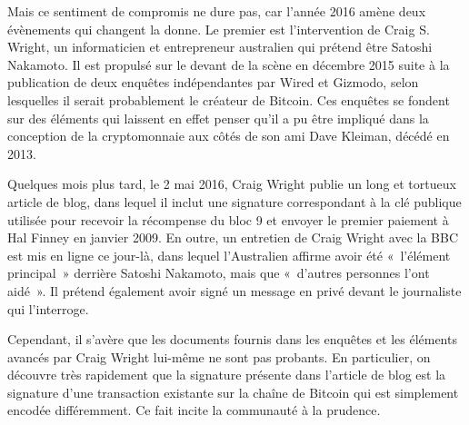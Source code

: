 Mais ce sentiment de compromis ne dure pas, car l'année 2016 amène deux évènements qui changent la donne. Le premier est l'intervention de Craig S. Wright, un informaticien et entrepreneur australien qui prétend être Satoshi Nakamoto. Il est propulsé sur le devant de la scène en décembre 2015 suite à la publication de deux enquêtes indépendantes par Wired et Gizmodo, selon lesquelles il serait probablement le créateur de Bitcoin. Ces enquêtes se fondent sur des éléments qui laissent en effet penser qu'il a pu être impliqué dans la conception de la cryptomonnaie aux côtés de son ami Dave Kleiman, décédé en 2013.

Quelques mois plus tard, le 2 mai 2016, Craig Wright publie un long et tortueux article de blog, dans lequel il inclut une signature correspondant à la clé publique utilisée pour recevoir la récompense du bloc 9 et envoyer le premier paiement à Hal Finney en janvier 2009. En outre, un entretien de Craig Wright avec la BBC est mis en ligne ce jour-là, dans lequel l'Australien affirme avoir été «~l'élément principal~» derrière Satoshi Nakamoto, mais que «~d'autres personnes l'ont aidé~». Il prétend également avoir signé un message en privé devant le journaliste qui l'interroge.

Cependant, il s'avère que les documents fournis dans les enquêtes et les éléments avancés par Craig Wright lui-même ne sont pas probants. En particulier, on découvre très rapidement que la signature présente dans l'article de blog est la signature d'une transaction existante sur la chaîne de Bitcoin qui est simplement encodée différemment. Ce fait incite la communauté à la prudence.

